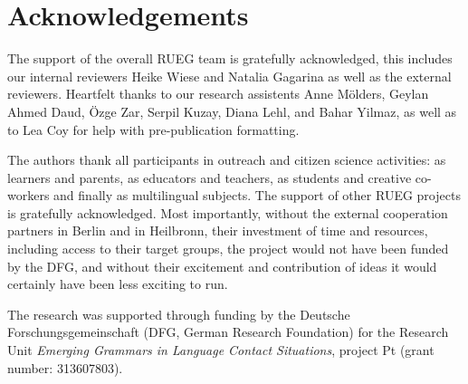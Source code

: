 \documentclass[output=paper,colorlinks,citecolor=brown]{langscibook}
\begin{document}
\section*{Acknowledgements}
The support of the overall RUEG team is gratefully acknowledged, this includes our internal reviewers Heike Wiese and Natalia Gagarina as well as the external reviewers. Heartfelt thanks to our research assistents Anne Mölders, Geylan Ahmed Daud, Özge Zar, Serpil Kuzay, Diana Lehl, and Bahar Yilmaz, as well as to Lea Coy for help with pre-publication formatting.

The authors thank all participants in outreach and citizen science activities: as learners and parents, as educators and teachers, as students and creative co-workers and finally as multilingual subjects. The support of other RUEG projects is gratefully acknowledged. Most importantly, without the external cooperation partners in Berlin and in Heilbronn, their investment of time and resources, including access to their target groups, the project would not have been funded by the DFG, and without their excitement and contribution of ideas it would certainly have been less exciting to run.

The research was supported through funding by the Deutsche Forschungsgemeinschaft (DFG, German Research Foundation) for the Research Unit \textit{Emerging Grammars in Language Contact Situations}, project Pt (grant number: 313607803).

\printbibliography[heading=subbibliography,notkeyword=this]
\end{document}
